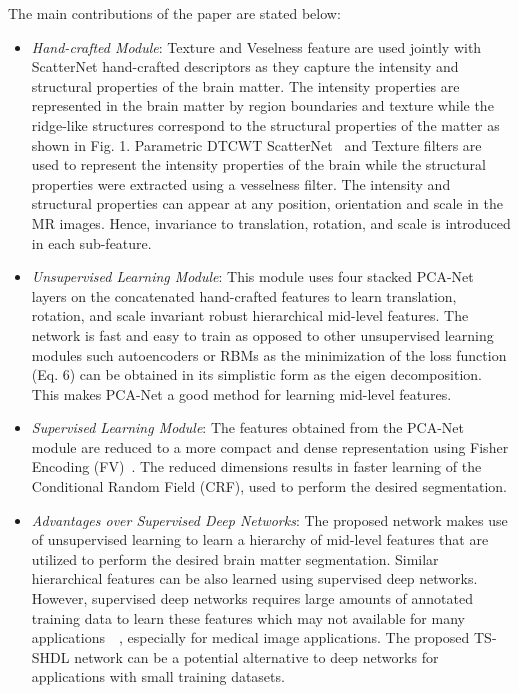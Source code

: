 \documentclass[10pt,twocolumn,letterpaper]{article}
\begin{document}
 The main contributions of the paper are stated below:
\begin{itemize}

\item \textit{Hand-crafted Module}: Texture and Veselness feature are used jointly with ScatterNet hand-crafted descriptors as they capture the intensity and structural properties of the brain matter. The intensity properties are represented in the brain matter by region boundaries and texture while the ridge-like structures correspond to the structural properties of the matter as shown in Fig. 1. Parametric DTCWT ScatterNet~\cite{singh2017dual} and Texture \cite{pitiot2004expert} filters are used to represent the intensity properties of the brain while the structural properties were extracted using a vesselness \cite{lindeberg1998edge} filter. The intensity and structural properties can appear at any position,
orientation and scale in the MR images. Hence, invariance to translation, rotation, and scale is introduced in each sub-feature. 

\item \textit{Unsupervised Learning Module}: This module uses four stacked PCA-Net~\cite{pcanet} layers on the concatenated hand-crafted features to learn translation, rotation, and scale invariant robust hierarchical mid-level features. The network is fast and easy to train as opposed to other unsupervised learning modules such autoencoders or RBMs as the minimization of the loss function (Eq. 6) can be obtained in its simplistic form as
the eigen decomposition. This makes PCA-Net a good
method for learning mid-level features.

\item \textit{Supervised Learning Module}: The features obtained from the PCA-Net module are reduced to a more compact and dense representation using Fisher Encoding (FV)~\cite{FV}. The reduced dimensions results in faster learning of the Conditional Random Field (CRF), used to perform the desired segmentation. 

\item \textit{Advantages over Supervised Deep Networks}: The proposed network makes use of unsupervised learning to learn a hierarchy of mid-level features that are utilized to perform the desired brain matter segmentation. Similar hierarchical features can be also learned using supervised deep networks. However, supervised deep networks requires large amounts of annotated training data to learn these features which may not available for many applications~~\cite{satellite,su,medical}, especially for medical image applications. The proposed TS-SHDL network can be a potential alternative to deep networks for applications with small training datasets. 

  \end{itemize}
\end{document}
